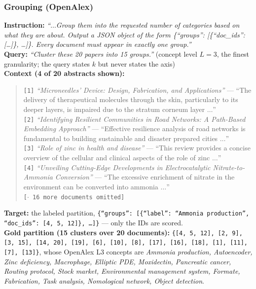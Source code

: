 \subsubsection{Grouping (OpenAlex)}

\textbf{Instruction:} \emph{``$\dots$Group them into the requested number of categories based on what
they are about. Output a JSON object of the form \{``groups'': [\{``doc\_ids'': [\dots]\}, \dots]\}.
Every document must appear in exactly one group.''}\\
\textbf{Query:} \emph{``Cluster these 20 papers into 15 groups.''} (concept level $L{=}3$, the finest
granularity; the query states $k$ but never states the axis)\\
\textbf{Context (4 of 20 abstracts shown):}
\begin{quote}\small
\texttt{[1]} \emph{``Microneedles' Device: Design, Fabrication, and Applications''} --- ``The
delivery of therapeutical molecules through the skin, particularly to its deeper layers, is impaired
due to the stratum corneum layer $\dots$''\\
\texttt{[2]} \emph{``Identifying Resilient Communities in Road Networks: A Path-Based Embedding
Approach''} --- ``Effective resilience analysis of road networks is fundamental to building
sustainable and disaster prepared cities $\dots$''\\
\texttt{[3]} \emph{``Role of zinc in health and disease''} --- ``This review provides a concise
overview of the cellular and clinical aspects of the role of zinc $\dots$''\\
\texttt{[4]} \emph{``Unveiling Cutting-Edge Developments in Electrocatalytic Nitrate-to-Ammonia
Conversion''} --- ``The excessive enrichment of nitrate in the environment can be converted into
ammonia $\dots$''\\
\texttt{[$\cdot$ 16 more documents omitted]}
\end{quote}
\textbf{Target:} the labeled partition, \texttt{\{``groups'': [\{``label'': ``Ammonia
production'', ``doc\_ids'': [4, 5, 12]\}, \dots]\}} --- only the IDs are scored.\\
\textbf{Gold partition (15 clusters over 20 documents):} \texttt{\{[4, 5, 12], [2, 9], [3, 15],
[14, 20], [19], [6], [10], [8], [17], [16], [18], [1], [11], [7], [13]\}}, whose OpenAlex L3 concepts
are \emph{Ammonia production, Autoencoder, Zinc deficiency, Macrophage, Elliptic PDE, Moxidectin,
Pancreatic cancer, Routing protocol, Stock market, Environmental management system, Formate,
Fabrication, Task analysis, Nomological network, Object detection}.


